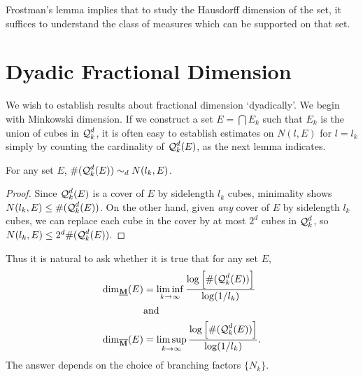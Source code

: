 Frostman's lemma implies that to study the Hausdorff dimension of the set, it suffices to understand the class of measures which can be supported on that set.




\section{Dyadic Fractional Dimension}

We wish to establish results about fractional dimension `dyadically'. We begin with Minkowski dimension. If we construct a set $E = \bigcap E_k$ such that $E_k$ is the union of cubes in $\operatorname{\mathcal{Q}}^d_k$, it is often easy to establish estimates on $N(l,E)$ for $l = l_k$ simply by counting the cardinality of $\operatorname{\mathcal{Q}}^d_k(E)$, as the next lemma indicates.

\begin{lemma} \label{comparableCovers}
	For any set $E$, $\#(\operatorname{\mathcal{Q}}_k^d(E)) \sim_d N(l_k,E)$.
\end{lemma}
\begin{proof}
	Since $\operatorname{\mathcal{Q}}_k^d(E)$ is a cover of $E$ by sidelength $l_k$ cubes, minimality shows $N(l_k,E) \leq \#(\operatorname{\mathcal{Q}}_k^d(E))$. On the other hand, given \emph{any} cover of $E$ by sidelength $l_k$ cubes, we can replace each cube in the cover by at most $2^d$ cubes in $\operatorname{\mathcal{Q}}_k^d$, so $N(l_k,E) \leq 2^d \#(\operatorname{\mathcal{Q}}_k^d(E))$.
\end{proof}

Thus it is natural to ask whether it is true that for any set $E$,
%
\begin{equation} \label{definingSequence}
	\begin{aligned}
		\operatorname{\dim_{\underline{\mathbf{M}}}}(E) &= \liminf_{k \to \infty} \frac{\log \left[ \#(\operatorname{\mathcal{Q}}_k^d(E)) \right]}{\log(1/l_k)}\\
		&\text{and}\\
		\operatorname{\dim_{\overline{\mathbf{M}}}}(E) &= \limsup_{k \to \infty} \frac{\log \left[ \#(\operatorname{\mathcal{Q}}_k^d(E)) \right]}{\log(1/l_k)}.
	\end{aligned}
\end{equation}
%
The answer depends on the choice of branching factors $\{ N_k \}$.

%
%

